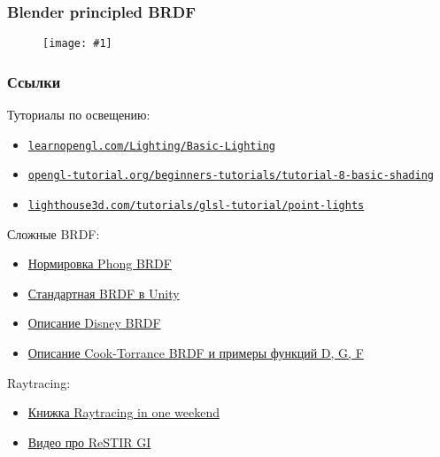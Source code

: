 \documentclass{beamer}
\newcommand{\slideimage}[1]{
  \begin{figure}
    \begin{adjustbox}{width=\textwidth, totalheight=\textheight-2\baselineskip-2\baselineskip,keepaspectratio}
      \texttt{[image: \#1]}
    \end{adjustbox}
  \end{figure}
}
\begin{document}
\begin{frame}[fragile]
\frametitle{Blender principled BRDF}
\slideimage{principled.png}
\end{frame}

\begin{frame}[fragile]
\frametitle{Ссылки}
Туториалы по освещению:
\begin{itemize}
\item \href{https://learnopengl.com/Lighting/Basic-Lighting}{\nolinkurl{learnopengl.com/Lighting/Basic-Lighting}}
\item \href{http://www.opengl-tutorial.org/beginners-tutorials/tutorial-8-basic-shading}{\nolinkurl{opengl-tutorial.org/beginners-tutorials/tutorial-8-basic-shading}}
\item \href{https://www.lighthouse3d.com/tutorials/glsl-tutorial/point-lights}{\nolinkurl{lighthouse3d.com/tutorials/glsl-tutorial/point-lights}}
\end{itemize}
Сложные BRDF:
\begin{itemize}
\item \href{http://www.cemyuksel.com/research/papers/CGI2020_ConstantTimeEnergyNormalizationForThePhongSpecularBRDFs.pdf}{Нормировка Phong BRDF}
\item \href{https://github.com/TwoTailsGames/Unity-Built-in-Shaders/blob/master/CGIncludes/UnityStandardBRDF.cginc}{Стандартная BRDF в Unity}
\item \href{https://blog.selfshadow.com/publications/s2012-shading-course/burley/s2012_pbs_disney_brdf_notes_v3.pdf}{Описание Disney BRDF}
\item \href{https://graphicscompendium.com/references/cook-torrance}{Описание Cook-Torrance BRDF и примеры функций D, G, F}
\end{itemize}
Raytracing:
\begin{itemize}
\item \href{https://raytracing.github.io/books/RayTracingInOneWeekend.html}{Книжка Raytracing in one weekend}
\item \href{https://www.youtube.com/watch?v=gsZiJeaMO48}{Видео про ReSTIR GI}
\end{itemize}
\end{frame}
\end{document}
